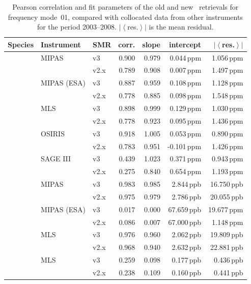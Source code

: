 \begin{table}[tbhp]
\centering
\caption{Pearson correlation and fit parameters of the old and new \smr\
retrievals for frequency mode~01, compared with collocated data from other
instruments for the period 2003--2008.
$\left|\left<\right.\right.$res.$\left.\left.\right>\right|$ is the mean
residual.}
\label{tab:fm01:stats}
\begin{tabular}{lllrrrr}
    \toprule
    \textbf{Species} & \textbf{Instrument} & \textbf{SMR} & \textbf{corr.} & \textbf{slope} & \textbf{intercept} & \textbf{$\left|\left<\right.\right.$res.$\left.\left.\right>\right|$} \\
    \midrule
    \chem{O3}   & MIPAS         & v3    & 0.900 & 0.979 & 0.044\,ppm    &  1.056\,ppm \\
                &               & v2.x  & 0.789 & 0.908 & 0.007\,ppm    &  1.497\,ppm \\
    \cline{2-7}
                & MIPAS (ESA)   & v3    & 0.887 & 0.959 & 0.108\,ppm    &  1.128\,ppm \\
                &               & v2.x  & 0.778 & 0.885 & 0.098\,ppm    &  1.548\,ppm \\
    \cline{2-7}
                & MLS           & v3    & 0.898 & 0.999 & 0.129\,ppm    &  1.030\,ppm \\
                &               & v2.x  & 0.778 & 0.923 & 0.095\,ppm    &  1.436\,ppm \\
    \cline{2-7}
                & OSIRIS        & v3    & 0.918 & 1.005 &  0.053\,ppm   &  0.890\,ppm \\
                &               & v2.x  & 0.783 & 0.951 & -0.101\,ppm   &  1.426\,ppm \\
    \cline{2-7}
                & SAGE III      & v3    & 0.439 & 1.023 & 0.371\,ppm    &  0.943\,ppm \\
                &               & v2.x  & 0.275 & 0.840 & 0.654\,ppm    &  1.193\,ppm \\
    \midrule
    \chem{N_2O} & MIPAS         & v3    & 0.983 & 0.985 & 2.844\,ppb    & 16.750\,ppb \\
                &               & v2.x  & 0.975 & 0.979 & 2.786\,ppb    & 20.055\,ppb \\
    \cline{2-7}
                & MIPAS (ESA)   & v3    & 0.017 & 0.000 & 67.659\,ppb   & 19.677\,ppm \\
                &               & v2.x  & 0.086 & 0.007 & 67.000\,ppb   &  1.148\,ppm \\
    \cline{2-7}
                & MLS           & v3    & 0.976 & 0.960 & 2.062\,ppb    & 19.809\,ppb \\
                &               & v2.x  & 0.968 & 0.940 & 2.632\,ppb    & 22.881\,ppb \\
    \midrule
    \chem{ClO}  & MLS           & v3    & 0.259 & 0.098 & 0.177\,ppb    &  0.436\,ppb \\
                &               & v2.x  & 0.238 & 0.109 & 0.160\,ppb    &  0.441\,ppb \\
    \bottomrule
\end{tabular}
\end{table}


